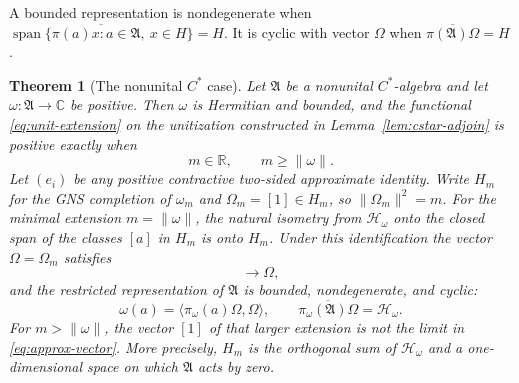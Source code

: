 \documentclass[11pt]{article}
\newtheorem{theorem}{Theorem}[section]
\theoremstyle{definition}
\theoremstyle{remark}
\numberwithin{equation}{section}
\newcommand{\R}{\mathbb R}
\newcommand{\C}{\mathbb C}
\begin{document}
A bounded representation is nondegenerate when
$\overline{\operatorname{span}\{\pi(a)x:a\in\mathfrak A,\ x\in H\}}=H$.
It is cyclic with vector $\Omega$ when
$\overline{\pi(\mathfrak A)\Omega}=H$.

\begin{theorem}[The nonunital $C^*$ case]
\label{thm:cstar-unitization}
Let $\mathfrak A$ be a nonunital $C^*$-algebra and let
$\omega:\mathfrak A\to\C$ be positive.  Then $\omega$ is Hermitian and
bounded, and the functional \eqref{eq:unit-extension} on the unitization
constructed in Lemma~\ref{lem:cstar-adjoin} is positive exactly when
\begin{equation}
 m\in\R,\qquad m\geq\|\omega\|.
 \label{eq:minimal-mass}
\end{equation}
Let $(e_i)$ be any positive contractive two-sided approximate identity.
Write $H_m$ for the GNS completion of $\omega_m$ and
$\Omega_m=[1]\in H_m$, so $\|\Omega_m\|^2=m$.
For the minimal extension $m=\|\omega\|$, the natural isometry from
$\mathcal H_\omega$ onto the closed span of the classes $[a]$ in $H_m$
is onto $H_m$.  Under this identification the vector
$\Omega=\Omega_m$ satisfies
\begin{equation}
 [e_i]\longrightarrow\Omega,
 \label{eq:approx-vector}
\end{equation}
and the restricted representation of $\mathfrak A$ is bounded,
nondegenerate, and cyclic:
\begin{equation}
 \omega(a)=\langle\pi_\omega(a)\Omega,\Omega\rangle,
 \qquad
 \overline{\pi_\omega(\mathfrak A)\Omega}=\mathcal H_\omega.
 \label{eq:cyclic-vector}
\end{equation}
For $m>\|\omega\|$, the vector $[1]$ of that larger extension is not the
limit in \eqref{eq:approx-vector}.  More precisely,
$H_m$ is the orthogonal sum of $\mathcal H_\omega$ and a one-dimensional
space on which $\mathfrak A$ acts by zero.
\end{theorem}
\end{document}
